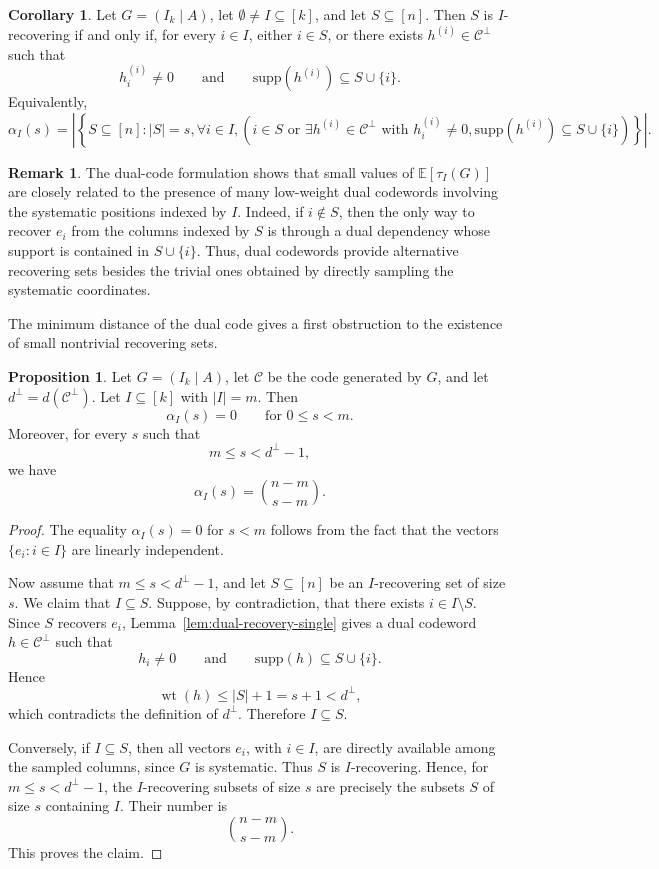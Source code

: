 \documentclass[11pt,a4paper]{article}
\numberwithin{equation}{section}
\theoremstyle{definition}
\newtheorem{remark}[definition]{Remark}
\theoremstyle{definition}
\newtheorem{proposition}[definition]{Proposition}
\newtheorem{corollary}[definition]{Corollary}
\newcommand{\E}{\mathbb{E}}
\newcommand{\cC}{\mathcal{C}}
\newcommand{\supp}{\mathrm{supp}}
\begin{document}
\begin{corollary}\label{cor:dual-recovery-I}
Let $G=(I_k\mid A)$, let $\emptyset\neq I\subseteq [k]$, and let
$S\subseteq [n]$.  Then $S$ is $I$-recovering if and only if, for every
$i\in I$, either $i\in S$, or there exists $h^{(i)}\in \cC^\perp$ such
that
\[
h^{(i)}_i\neq 0
\qquad\text{and}\qquad
\supp(h^{(i)})\subseteq S\cup\{i\}.
\]
Equivalently,
\[
\alpha_I(s)=
\left|
\left\{
S\subseteq [n] : |S|=s,
\forall i\in I,
\left(
 i\in S
 \text{ or }
 \exists h^{(i)}\in \cC^\perp
 \text{ with }
 h^{(i)}_i\neq 0,
 \supp(h^{(i)})\subseteq S\cup\{i\}
\right)
\right\}
\right|.
\]
\end{corollary}

\begin{remark}\label{rem:dual-low-weight}
The dual-code formulation shows that small values of $\E[\tau_I(G)]$ are
closely related to the presence of many low-weight dual codewords involving
the systematic positions indexed by $I$.  Indeed, if $i\notin S$, then the
only way to recover $e_i$ from the columns indexed by $S$ is through a
dual dependency whose support is contained in $S\cup\{i\}$.  Thus, dual
codewords provide alternative recovering sets besides the trivial ones obtained
by directly sampling the systematic coordinates.
\end{remark}

The minimum distance of the dual code gives a first obstruction to the
existence of small nontrivial recovering sets.

\begin{proposition}\label{prop:dual-distance-alpha}
Let $G=(I_k\mid A)$, let $\cC$ be the code generated by $G$, and let
$d^\perp=d(\cC^\perp)$.  Let $I\subseteq [k]$ with $|I|=m$.  Then
\[
\alpha_I(s)=0
\qquad\text{for }0\leq s<m.
\]
Moreover, for every $s$ such that
\[
m\leq s<d^\perp-1,
\]
we have
\[
\alpha_I(s)=\binom{n-m}{s-m}.
\]
\end{proposition}

\begin{proof}
The equality $\alpha_I(s)=0$ for $s<m$ follows from the fact that the
vectors $\{e_i:i\in I\}$ are linearly independent.

Now assume that $m\leq s<d^\perp-1$, and let $S\subseteq [n]$ be an
$I$-recovering set of size $s$.  We claim that $I\subseteq S$.  Suppose,
by contradiction, that there exists $i\in I\setminus S$.  Since $S$
recovers $e_i$, Lemma~\ref{lem:dual-recovery-single} gives a dual codeword
$h\in \cC^\perp$ such that
\[
h_i\neq 0
\qquad\text{and}\qquad
\supp(h)\subseteq S\cup\{i\}.
\]
Hence
\[
\operatorname{wt}(h)\leq |S|+1=s+1<d^\perp,
\]
which contradicts the definition of $d^\perp$.  Therefore $I\subseteq S$.

Conversely, if $I\subseteq S$, then all vectors $e_i$, with $i\in I$,
are directly available among the sampled columns, since $G$ is systematic.
Thus $S$ is $I$-recovering.  Hence, for $m\leq s<d^\perp-1$, the
$I$-recovering subsets of size $s$ are precisely the subsets $S$ of size
$s$ containing $I$.  Their number is
\[
\binom{n-m}{s-m}.
\]
This proves the claim.
\end{proof}
\end{document}
